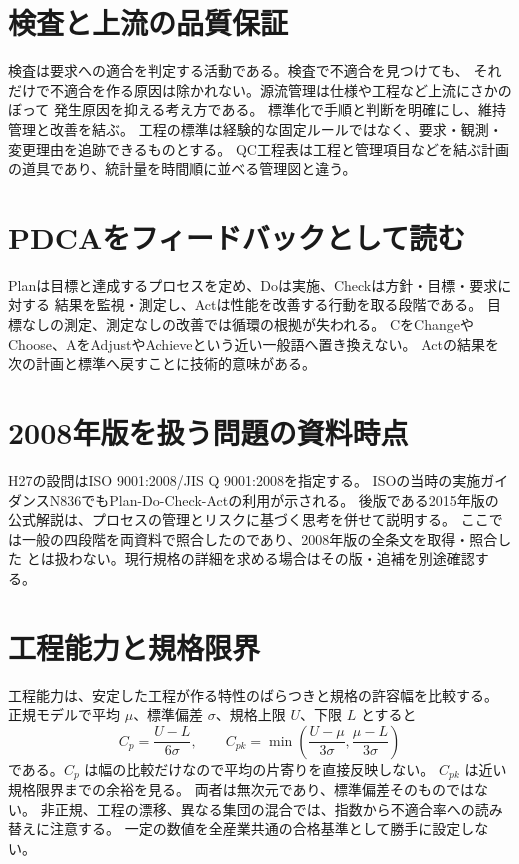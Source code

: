 \section{検査と上流の品質保証}
\label{theory:quality:assurance}
検査は要求への適合を判定する活動である。検査で不適合を見つけても、
それだけで不適合を作る原因は除かれない。源流管理は仕様や工程など上流にさかのぼって
発生原因を抑える考え方である。
標準化で手順と判断を明確にし、維持管理と改善を結ぶ。
工程の標準は経験的な固定ルールではなく、要求・観測・変更理由を追跡できるものとする。
QC工程表は工程と管理項目などを結ぶ計画の道具であり、統計量を時間順に並べる管理図と違う。
\cite{quality_process_jsqc}

\section{PDCAをフィードバックとして読む}
\label{theory:quality:pdca}
Planは目標と達成するプロセスを定め、Doは実施、Checkは方針・目標・要求に対する
結果を監視・測定し、Actは性能を改善する行動を取る段階である。
目標なしの測定、測定なしの改善では循環の根拠が失われる。
CをChangeやChoose、AをAdjustやAchieveという近い一般語へ置き換えない。
Actの結果を次の計画と標準へ戻すことに技術的意味がある。
\cite{quality_iso_process}

\section{2008年版を扱う問題の資料時点}
\label{theory:quality:historical}
H27の設問はISO 9001:2008/JIS Q 9001:2008を指定する。
ISOの当時の実施ガイダンスN836でもPlan-Do-Check-Actの利用が示される。
後版である2015年版の公式解説は、プロセスの管理とリスクに基づく思考を併せて説明する。
ここでは一般の四段階を両資料で照合したのであり、2008年版の全条文を取得・照合した
とは扱わない。現行規格の詳細を求める場合はその版・追補を別途確認する。
\cite{quality_iso2008_guidance,quality_iso_process}

\section{工程能力と規格限界}
\label{theory:quality:capability}
工程能力は、安定した工程が作る特性のばらつきと規格の許容幅を比較する。
正規モデルで平均 \(\mu\)、標準偏差 \(\sigma\)、規格上限 \(U\)、下限 \(L\) とすると
\[
 C_p=\frac{U-L}{6\sigma},\qquad
 C_{pk}=\min\left(\frac{U-\mu}{3\sigma},\frac{\mu-L}{3\sigma}\right)
\]
である。\(C_p\) は幅の比較だけなので平均の片寄りを直接反映しない。
\(C_{pk}\) は近い規格限界までの余裕を見る。
両者は無次元であり、標準偏差そのものではない。
非正規、工程の漂移、異なる集団の混合では、指数から不適合率への読み替えに注意する。
一定の数値を全産業共通の合格基準として勝手に設定しない。\cite{quality_nist_capability}

